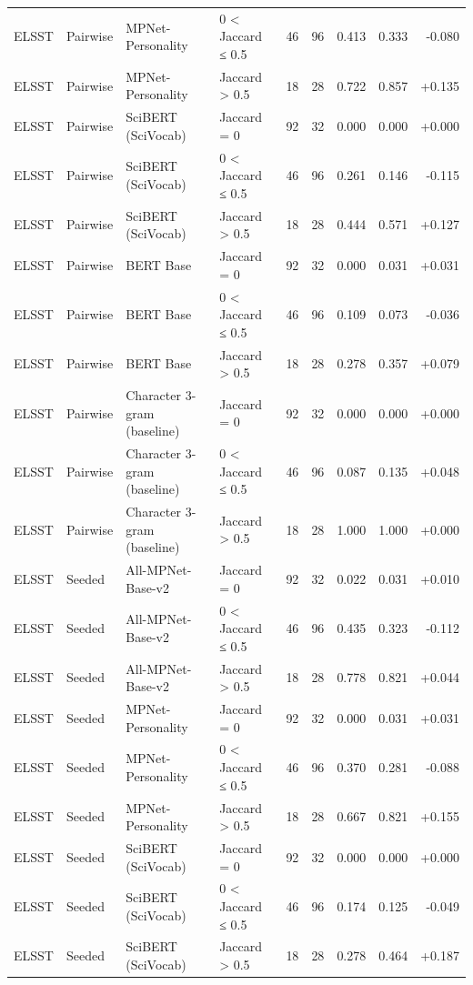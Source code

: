 \begin{table}[ht]
\begin{tabular}{llllrrrrr}
ELSST & Pairwise & MPNet-Personality & 0 < Jaccard ≤ 0.5 & 46 & 96 & 0.413 & 0.333 & -0.080 \\
ELSST & Pairwise & MPNet-Personality & Jaccard > 0.5 & 18 & 28 & 0.722 & 0.857 & +0.135 \\
ELSST & Pairwise & SciBERT (SciVocab) & Jaccard = 0 & 92 & 32 & 0.000 & 0.000 & +0.000 \\
ELSST & Pairwise & SciBERT (SciVocab) & 0 < Jaccard ≤ 0.5 & 46 & 96 & 0.261 & 0.146 & -0.115 \\
ELSST & Pairwise & SciBERT (SciVocab) & Jaccard > 0.5 & 18 & 28 & 0.444 & 0.571 & +0.127 \\
ELSST & Pairwise & BERT Base & Jaccard = 0 & 92 & 32 & 0.000 & 0.031 & +0.031 \\
ELSST & Pairwise & BERT Base & 0 < Jaccard ≤ 0.5 & 46 & 96 & 0.109 & 0.073 & -0.036 \\
ELSST & Pairwise & BERT Base & Jaccard > 0.5 & 18 & 28 & 0.278 & 0.357 & +0.079 \\
ELSST & Pairwise & Character 3-gram (baseline) & Jaccard = 0 & 92 & 32 & 0.000 & 0.000 & +0.000 \\
ELSST & Pairwise & Character 3-gram (baseline) & 0 < Jaccard ≤ 0.5 & 46 & 96 & 0.087 & 0.135 & +0.048 \\
ELSST & Pairwise & Character 3-gram (baseline) & Jaccard > 0.5 & 18 & 28 & 1.000 & 1.000 & +0.000 \\
ELSST & Seeded & All-MPNet-Base-v2 & Jaccard = 0 & 92 & 32 & 0.022 & 0.031 & +0.010 \\
ELSST & Seeded & All-MPNet-Base-v2 & 0 < Jaccard ≤ 0.5 & 46 & 96 & 0.435 & 0.323 & -0.112 \\
ELSST & Seeded & All-MPNet-Base-v2 & Jaccard > 0.5 & 18 & 28 & 0.778 & 0.821 & +0.044 \\
ELSST & Seeded & MPNet-Personality & Jaccard = 0 & 92 & 32 & 0.000 & 0.031 & +0.031 \\
ELSST & Seeded & MPNet-Personality & 0 < Jaccard ≤ 0.5 & 46 & 96 & 0.370 & 0.281 & -0.088 \\
ELSST & Seeded & MPNet-Personality & Jaccard > 0.5 & 18 & 28 & 0.667 & 0.821 & +0.155 \\
ELSST & Seeded & SciBERT (SciVocab) & Jaccard = 0 & 92 & 32 & 0.000 & 0.000 & +0.000 \\
ELSST & Seeded & SciBERT (SciVocab) & 0 < Jaccard ≤ 0.5 & 46 & 96 & 0.174 & 0.125 & -0.049 \\
ELSST & Seeded & SciBERT (SciVocab) & Jaccard > 0.5 & 18 & 28 & 0.278 & 0.464 & +0.187 \\

\end{tabular}
\end{table}
